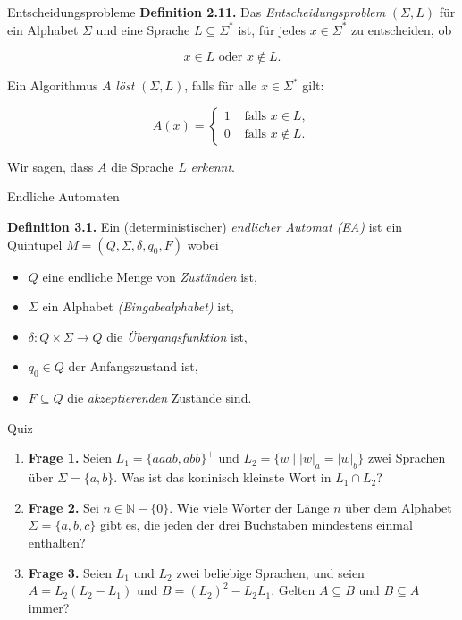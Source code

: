 \documentclass[11pt,aspectratio=169]{beamer}
\begin{document}
\begin{frame}{Entscheidungsprobleme}
    \textbf{Definition 2.11.} Das \textit{Entscheidungsproblem}
    \((\Sigma, L)\) für ein Alphabet \(\Sigma\) und eine
    Sprache \(L \subseteq \Sigma^*\) ist, für jedes
    \(x \in \Sigma^*\) zu entscheiden, ob

    \[
        x \in L \text{ oder } x \not\in L.
    \]

    Ein Algorithmus \(A\) \textit{löst} \((\Sigma, L)\), falls für
    alle \(x \in \Sigma^*\) gilt:

    \[
        A(x) = \begin{cases}
            1 & \text{ falls } x \in L, \\
            0 & \text{ falls } x \not\in L.
        \end{cases}
    \]

    Wir sagen, dass \(A\) die Sprache \(L\) \textit{erkennt}.

\end{frame}

\begin{frame}{Endliche Automaten}

\textbf{Definition 3.1.}
Ein (deterministischer) \textit{endlicher Automat (EA)} ist ein
Quintupel \(M = (Q, \Sigma, \delta, q_0, F)\) wobei
\begin{itemize}
    \item \(Q\) eine endliche Menge von \textit{Zuständen} ist,
    \item \(\Sigma\) ein Alphabet \textit{(Eingabealphabet)} ist,
    \item \(\delta \colon Q \times \Sigma \to Q\) die \textit{Übergangsfunktion} ist,
    \item \(q_0 \in Q\) der Anfangszustand ist,
    \item \(F \subseteq Q\) die \textit{akzeptierenden} Zustände sind.
\end{itemize}

\end{frame}

\begin{frame}{Quiz}
    \begin{enumerate}
        \justifying
        \item \textbf{Frage 1.}
            Seien \(L_1 = \{aaab, abb\}^+\) und \(L_2 = \{w \mid |w|_a = |w|_b\}\)
            zwei Sprachen über \(\Sigma = \{a, b\}\). Was ist das koninisch
            kleinste Wort in \(L_1 \cap L_2\)?

        \item \textbf{Frage 2.}
            Sei \(n \in \mathbb N - \{0\}\). Wie viele Wörter der Länge \(n\)
            über dem Alphabet \(\Sigma = \{a, b, c\}\) gibt es, die jeden der drei
            Buchstaben mindestens einmal enthalten?

        \item \textbf{Frage 3.}
            Seien \(L_1\) und \(L_2\) zwei beliebige Sprachen, und seien
            \(A = L_2(L_2 - L_1)\) und \(B = (L_2)^2 - L_2 L_1\).
            Gelten \(A \subseteq B\) und \(B \subseteq A\) immer?

    \end{enumerate}
\end{frame}
\end{document}
